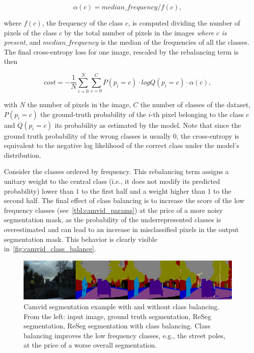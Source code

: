 \begin{equation}
    \alpha(c) = median\_frequency / f(c),
\end{equation}

\noindent where $f(c)$, the frequency of the class $c$, is computed dividing
the number of pixels of the class $c$ by the total number of pixels in the
images \emph{where $c$ is present}, and $median\_frequency$ is the median of
the frequencies of all the classes. The final cross-entropy loss for one image,
rescaled by the rebalancing term is then

\begin{equation}
    cost = -\frac{1}{N} \sum_{i=0}^N \sum_{c=0}^C P(p_i = c) \cdot logQ(p_i= c)
        \cdot \alpha(c),
\end{equation}

\noindent with $N$ the number of pixels in the image, $C$ the number of classes
of the dataset, $P(p_i=c)$ the ground-truth probability of the $i$-th pixel
belonging to the class $c$ and $Q(p_i=c)$ its probability as estimated by the
model. Note that since the ground truth probability of the wrong classes is
usually $0$, the cross-entropy is equivalent to the negative log likelihood of
the correct class under the model's distribution.

Consider the classes ordered by frequency. This rebalancing term assigns a
unitary weight to the central class (i.e., it does not modify its predicted
probability) lower than $1$ to the first half and a weight higher than $1$ to
the second half. The final effect of class balancing is to increase the score
of the low frequency classes (see~\autoref{tbl:camvid_params}) at the price of
a more noisy segmentation mask, as the probability of the underrepresented
classes is overestimated and can lead to an increase in misclassified pixels in
the output segmentation mask. This behavior is clearly visible
in~\autoref{fig:camvid_class_balance}.

\begin{figure}[t]
    \centering
    \includegraphics[width=\textwidth]{img/reseg/samples/camvid_classbal_diff.png}
    \caption{Camvid segmentation example with and without class balancing. From
        the left: input image, ground truth segmentation, ReSeg segmentation,
        ReSeg segmentation with class balancing. Class balancing improves the
        low frequency classes, e.g., the street poles, at the price of a
        worse overall segmentation.}
    \label{fig:camvid_class_balance}
\end{figure}

